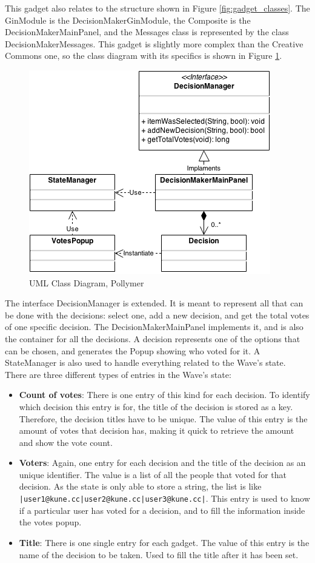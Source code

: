 This gadget also relates to the structure shown in Figure \ref{fig:gadget_classes}. The GinModule is the DecisionMakerGinModule, the Composite is the DecisionMakerMainPanel, and the Messages class is represented by the class DecisionMakerMessages. This gadget is slightly more complex than the Creative Commons one, so the class diagram with its specifics is shown in Figure \ref{fig:decision_maker_diagram}.
\begin{figure}[h]
  \center
    \includegraphics[keepaspectratio, scale=0.5]{Media/Diagrams/Gadget/DecisionMaker.png}
  \caption{UML Class Diagram, Pollymer}
  \label{fig:decision_maker_diagram}
\end{figure}
The interface DecisionManager is extended. It is meant to represent all that can be done with the decisions: select one, add a new decision, and get the total votes of one specific decision. The DecisionMakerMainPanel implements it, and is also the container for all the decisions. A decision represents one of the options that can be chosen, and generates the Popup showing who voted for it. A StateManager is also used to handle everything related to the Wave's state.\\[.2cm]
There are three different types of entries in the Wave's state:
\begin{itemize}
  \item \textbf{Count of votes}: There is one entry of this kind for each decision. To identify which decision this entry is for, the title of the decision is stored as a key. Therefore, the decision titles have to be unique. The value of this entry is the amount of votes that decision has, making it quick to retrieve the amount and show the vote count.
  \item \textbf{Voters}: Again, one entry for each decision and the title of the decision as an unique identifier. The value is a list of all the people that voted for that decision. As the state is only able to store a string, the list is like \verb+|user1@kune.cc|user2@kune.cc|user3@kune.cc|+. This entry is used to know if a particular user has voted for a decision, and to fill the information inside the votes popup.
  \item \textbf{Title}: There is one single entry for each gadget. The value of this entry is the name of the decision to be taken. Used to fill the title after it has been set.
\end{itemize}
